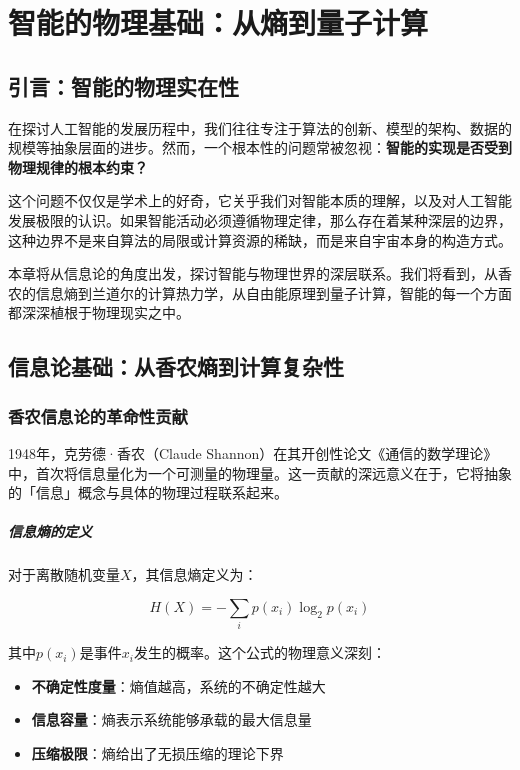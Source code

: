 \chapter{智能的物理基础：从熵到量子计算}

\section{引言：智能的物理实在性}

在探讨人工智能的发展历程中，我们往往专注于算法的创新、模型的架构、数据的规模等抽象层面的进步。然而，一个根本性的问题常被忽视：\textbf{智能的实现是否受到物理规律的根本约束？}

这个问题不仅仅是学术上的好奇，它关乎我们对智能本质的理解，以及对人工智能发展极限的认识。如果智能活动必须遵循物理定律，那么存在着某种深层的边界，这种边界不是来自算法的局限或计算资源的稀缺，而是来自宇宙本身的构造方式。

本章将从信息论的角度出发，探讨智能与物理世界的深层联系。我们将看到，从香农的信息熵到兰道尔的计算热力学，从自由能原理到量子计算，智能的每一个方面都深深植根于物理现实之中。

\section{信息论基础：从香农熵到计算复杂性}

\subsection{香农信息论的革命性贡献}

1948年，克劳德·香农（Claude Shannon）在其开创性论文《通信的数学理论》中，首次将信息量化为一个可测量的物理量。这一贡献的深远意义在于，它将抽象的「信息」概念与具体的物理过程联系起来。

\paragraph{信息熵的定义}
对于离散随机变量$X$，其信息熵定义为：

$$H(X) = -\sum_{i} p(x_i) \log_2 p(x_i)$$

其中$p(x_i)$是事件$x_i$发生的概率。这个公式的物理意义深刻：
\begin{itemize}
\item \textbf{不确定性度量}：熵值越高，系统的不确定性越大
\item \textbf{信息容量}：熵表示系统能够承载的最大信息量
\item \textbf{压缩极限}：熵给出了无损压缩的理论下界
\end{itemize}

